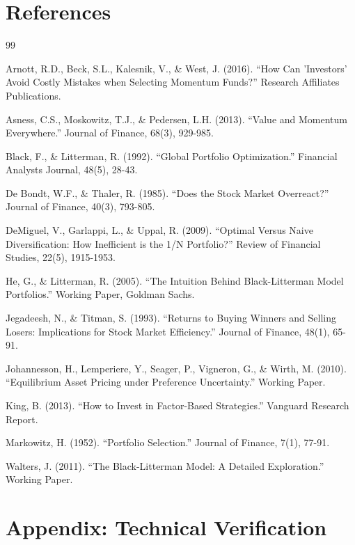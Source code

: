 \documentclass[12pt,a4paper]{article}
\begin{document}
\newpage
\section*{References}

\begin{thebibliography}{99}

Arnott, R.D., Beck, S.L., Kalesnik, V., \& West, J. (2016). ``How Can 'Investors' Avoid Costly Mistakes when Selecting Momentum Funds?'' Research Affiliates Publications.

Asness, C.S., Moskowitz, T.J., \& Pedersen, L.H. (2013). ``Value and Momentum Everywhere.'' Journal of Finance, 68(3), 929-985.

Black, F., \& Litterman, R. (1992). ``Global Portfolio Optimization.'' Financial Analysts Journal, 48(5), 28-43.

De Bondt, W.F., \& Thaler, R. (1985). ``Does the Stock Market Overreact?'' Journal of Finance, 40(3), 793-805.

DeMiguel, V., Garlappi, L., \& Uppal, R. (2009). ``Optimal Versus Naive Diversification: How Inefficient is the 1/N Portfolio?'' Review of Financial Studies, 22(5), 1915-1953.

He, G., \& Litterman, R. (2005). ``The Intuition Behind Black-Litterman Model Portfolios.'' Working Paper, Goldman Sachs.

Jegadeesh, N., \& Titman, S. (1993). ``Returns to Buying Winners and Selling Losers: Implications for Stock Market Efficiency.'' Journal of Finance, 48(1), 65-91.

Johannesson, H., Lemperiere, Y., Seager, P., Vigneron, G., \& Wirth, M. (2010). ``Equilibrium Asset Pricing under Preference Uncertainty.'' Working Paper.

King, B. (2013). ``How to Invest in Factor-Based Strategies.'' Vanguard Research Report.

Markowitz, H. (1952). ``Portfolio Selection.'' Journal of Finance, 7(1), 77-91.

Walters, J. (2011). ``The Black-Litterman Model: A Detailed Exploration.'' Working Paper.

\end{thebibliography}

\newpage
\section*{Appendix: Technical Verification}
\end{document}
